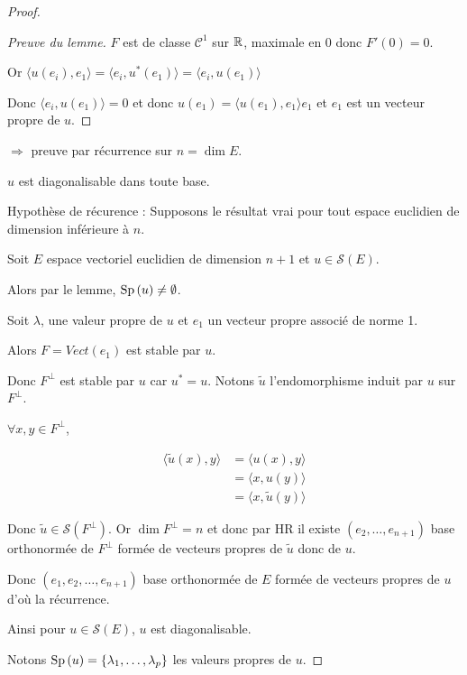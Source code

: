 \begin{proof}
\begin{proof}[Preuve du lemme]
    $F$ est de classe $\mathscr C^1$ sur $\mathbb{R}$, maximale en $0$ donc $F'(0) = 0$. 

    Or $\langle u(e_i), e_1 \rangle = \langle e_i, u^*(e_1) \rangle = \langle e_i, u(e_1) \rangle $ 

    Donc $\langle e_i, u(e_1) \rangle = 0$ et donc $u(e_1) = \langle u(e_1), e_1 \rangle e_1$ et 
    $e_1$ est un vecteur propre de $u$. 

    \end{proof}

    \lvspace $\Rightarrow$ preuve par récurrence sur $n = \dim E$. 

     $u$ est diagonalisable dans toute base. 

    \svspace Hypothèse de récurence : Supposons le résultat vrai pour tout espace euclidien 
    de dimension inférieure à $n$. 

    Soit $E$ espace vectoriel euclidien de dimension $n + 1$ et $u \in \mathscr S(E)$. 

    Alors par le lemme, $\operatorname{Sp} \,(u) \neq \emptyset$. 

    Soit $\lambda$, une valeur propre de $u$ et $e_1$ un vecteur propre associé de norme 1. 

    Alors $F = Vect (e_1)$ est stable par $u$. 

    Donc $F^\perp$ est stable par $u$ car $u^* = u$. Notons $\tilde u$ l'endomorphisme induit par 
    $u$ sur $F^\perp$.

    $\forall x, y \in F^\perp$, 

    \begin{align}
        \langle \tilde u (x), y \rangle & = \langle u(x), y \rangle  \\
        & = \langle x, u(y) \rangle \\
        & = \langle x, \tilde u (y) \rangle
    \end{align}

    Donc $\tilde u \in \mathscr S(F^\perp)$. Or 
    $\dim F^\perp = n$ et donc par HR il existe 
    $(e_2, \dots, e_{n + 1})$ base orthonormée de $F^\perp$ formée de vecteurs propres de 
    $\tilde u$ donc de $u$. 

    Donc $(e_1, e_2, \dots, e_{n + 1})$ base orthonormée de $E$ formée de vecteurs propres de $u$
    d'où la récurrence. 

    Ainsi pour $u \in \mathscr S(E)$, $u$ est diagonalisable. 

    Notons $\operatorname{Sp} \,(u) = \{\lambda_1, \dots, \lambda_p\}$ les valeurs propres de $u$.


\end{proof}
